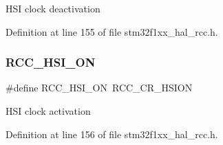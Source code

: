 H\+SI clock deactivation 

Definition at line 155 of file stm32f1xx\+\_\+hal\+\_\+rcc.\+h.

\mbox{\label{group___r_c_c___h_s_i___config_ga0bf09ef9e46d5da25cced7b3122f92f5}} 
\subsubsection{\texorpdfstring{R\+C\+C\+\_\+\+H\+S\+I\+\_\+\+ON}{RCC\_HSI\_ON}}
{\footnotesize\ttfamily \#define R\+C\+C\+\_\+\+H\+S\+I\+\_\+\+ON~R\+C\+C\+\_\+\+C\+R\+\_\+\+H\+S\+I\+ON}

H\+SI clock activation 

Definition at line 156 of file stm32f1xx\+\_\+hal\+\_\+rcc.\+h.

